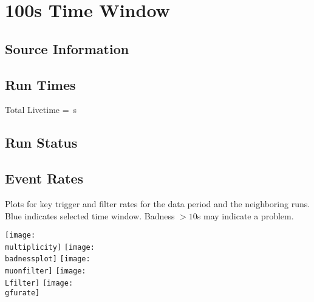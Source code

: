 \documentclass[titlepage]{article}
\begin{document}
\vfill

\pagebreak
\section{100s Time Window}

\subsection{Source Information}
\sourcetable

\subsection{Run Times}
\runtimetable

Total Livetime = \livetime\,s

\subsection{Run Status}
\runstatustable

\pagebreak
\subsection{Event Rates}
Plots for key trigger and filter rates for the data period
and the neighboring runs.  Blue indicates selected time window.
Badness $>10$s may indicate a problem.

\vspace{1em}
{
 \centering
 \texttt{[image: \\multiplicity]}
 \texttt{[image: \\badnessplot]}
 \texttt{[image: \\muonfilter]}
 \texttt{[image: \\Lfilter]}
 \texttt{[image: \\gfurate]}
}


%
%
%
%
%
%
%
\end{document}
